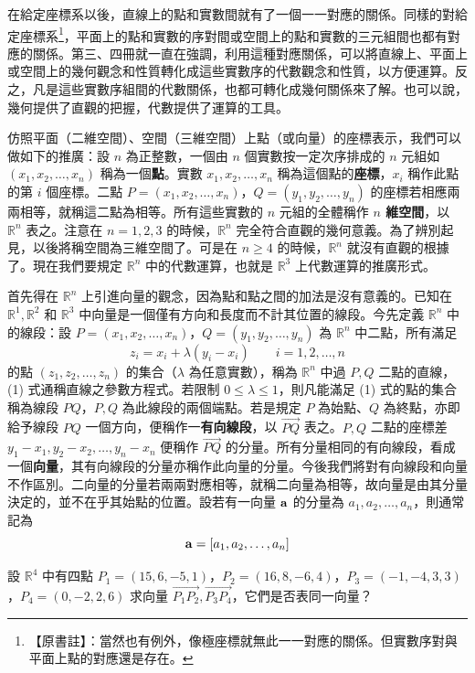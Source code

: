 在給定座標系以後，直線上的點和實數間就有了一個一一對應的關係。同樣的對給定座標系\footnote{【原書註】：當然也有例外，像極座標就無此一一對應的關係。但實數序對與平面上點的對應還是存在。}，平面上的點和實數的序對間或空間上的點和實數的三元組間也都有對應的關係。第三、四冊就一直在強調，利用這種對應關係，可以將直線上、平面上或空間上的幾何觀念和性質轉化成這些實數序的代數觀念和性質，以方便運算。反之，凡是這些實數序組間的代數關係，也都可轉化成幾何關係來了解。也可以說，幾何提供了直觀的把握，代數提供了運算的工具。

仿照平面（二維空間）、空間（三維空間）上點（或向量）的座標表示，我們可以做如下的推廣：設 $n$ 為正整數，一個由 $n$ 個實數按一定次序排成的 $n$ 元組如 $(x_1, x_2, \dots, x_n)$ 稱為一個\textbf{點}。實數 $x_1, x_2, \dots, x_n$ 稱為這個點的\textbf{座標}，$x_i$ 稱作此點的第 $i$ 個座標。二點 $P=(x_1, x_2, \dots, x_n)$，$Q=(y_1, y_2, \dots, y_n)$ 的座標若相應兩兩相等，就稱這二點為相等。所有這些實數的 $n$ 元組的全體稱作 \textbf{$n$ 維空間}，以 $\mathbb{R}^n$ 表之。注意在 $n=1, 2, 3$ 的時候，$\mathbb{R}^n$ 完全符合直觀的幾何意義。為了辨別起見，以後將稱空間為三維空間了。可是在 $n \ge 4$ 的時候，$\mathbb{R}^n$ 就沒有直觀的根據了。現在我們要規定 $\mathbb{R}^n$ 中的代數運算，也就是 $\mathbb{R}^3$ 上代數運算的推廣形式。

首先得在 $\mathbb{R}^n$ 上引進向量的觀念，因為點和點之間的加法是沒有意義的。已知在 $\mathbb{R}^1, \mathbb{R}^2$ 和 $\mathbb{R}^3$ 中向量是一個僅有方向和長度而不計其位置的線段。今先定義 $\mathbb{R}^n$ 中的線段：設 $P=(x_1, x_2, \dots, x_n)$，$Q=(y_1, y_2, \dots, y_n)$ 為 $\mathbb{R}^n$ 中二點，所有滿足
\begin{equation}
z_i = x_i + \lambda (y_i - x_i) \qquad i=1, 2, \dots, n \label{eq:b6s-1-1-1}
\end{equation}
的點 $(z_1, z_2, \dots, z_n)$ 的集合（$\lambda$ 為任意實數），稱為 $\mathbb{R}^n$ 中過 $P, Q$ 二點的直線，(1) 式通稱直線之參數方程式。若限制 $0 \le \lambda \le 1$，則凡能滿足 (1) 式的點的集合稱為線段 $PQ$，$P, Q$ 為此線段的兩個端點。若是規定 $P$ 為始點、$Q$ 為終點，亦即給予線段 $PQ$ 一個方向，便稱作一\textbf{有向線段}，以 $\vec{PQ}$ 表之。$P, Q$ 二點的座標差 $y_1 - x_1, y_2 - x_2, \dots, y_n - x_n$ 便稱作 $\vec{PQ}$ 的分量。所有分量相同的有向線段，看成一個\textbf{向量}，其有向線段的分量亦稱作此向量的分量。今後我們將對有向線段和向量不作區別。二向量的分量若兩兩對應相等，就稱二向量為相等，故向量是由其分量決定的，並不在乎其始點的位置。設若有一向量 $\boldsymbol{\mathbf{a}}$ 的分量為 $a_1, a_2, \dots, a_n$，則通常記為
\[ \boldsymbol{\mathbf{a}} = [a_1, a_2, \dots, a_n] \]

\begin{example}\label{ex:b6s-1-1}
設 $\mathbb{R}^4$ 中有四點 $P_1=(15, 6, -5, 1)$，$P_2=(16, 8, -6, 4)$，$P_3=(-1, -4, 3, 3)$，$P_4=(0, -2, 2, 6)$ 求向量 $\vec{P_1P_2}, \vec{P_3P_4}$，它們是否表同一向量？
\end{example}

